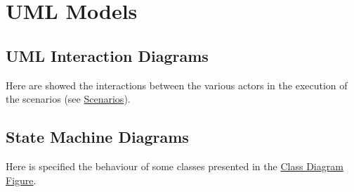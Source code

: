 \section{UML Models}

		
        

        
                        
		\subsection{UML Interaction Diagrams}
		Here are showed the interactions between the various actors in the execution of the scenarios (see \hyperref[sec:SectionScenarios]{Scenarios}).

			

			

			

			

			

			

			

			

			
			
			

			

			

			

			

		\subsection{State Machine Diagrams}
		Here is specified the behaviour of some classes presented in the \hyperref[sec:ClassDiagramFigure]{Class Diagram Figure}.

			

			

